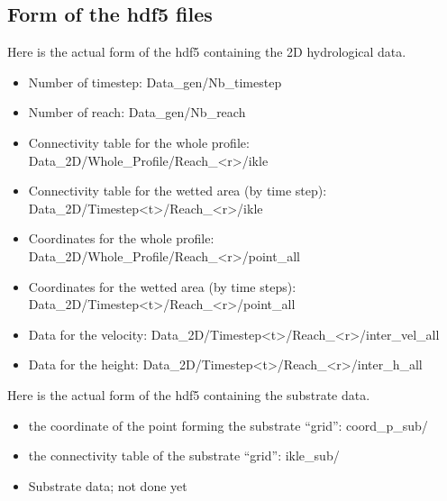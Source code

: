 \documentclass[letterpaper,10pt,english]{sphinxmanual}
\begin{document}
\subsection{Form of the hdf5 files}
\label{\detokenize{index:form-of-the-hdf5-files}}
Here is the actual form of the hdf5 containing the 2D hydrological data.
\begin{itemize}
\item {} 
Number of timestep: Data\_gen/Nb\_timestep

\item {} 
Number of reach: Data\_gen/Nb\_reach

\item {} 
Connectivity table for the whole profile: Data\_2D/Whole\_Profile/Reach\_\textless{}r\textgreater{}/ikle

\item {} 
Connectivity table for the wetted area (by time step): Data\_2D/Timestep\textless{}t\textgreater{}/Reach\_\textless{}r\textgreater{}/ikle

\item {} 
Coordinates for the whole profile: Data\_2D/Whole\_Profile/Reach\_\textless{}r\textgreater{}/point\_all

\item {} 
Coordinates for the wetted area (by time steps): Data\_2D/Timestep\textless{}t\textgreater{}/Reach\_\textless{}r\textgreater{}/point\_all

\item {} 
Data for the velocity: Data\_2D/Timestep\textless{}t\textgreater{}/Reach\_\textless{}r\textgreater{}/inter\_vel\_all

\item {} 
Data for the height:  Data\_2D/Timestep\textless{}t\textgreater{}/Reach\_\textless{}r\textgreater{}/inter\_h\_all

\end{itemize}

Here is the actual form of the hdf5 containing the substrate data.
\begin{itemize}
\item {} 
the coordinate of the point forming the substrate ``grid'': coord\_p\_sub/

\item {} 
the connectivity table of the substrate ``grid'': ikle\_sub/

\item {} 
Substrate data; not done yet

\end{itemize}
\end{document}
